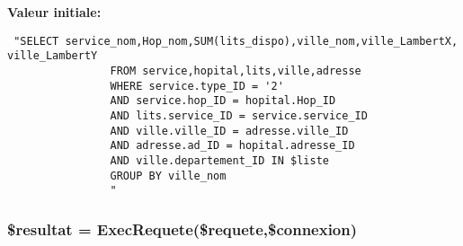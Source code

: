 {\bf Valeur initiale:}

\footnotesize\begin{verbatim} "SELECT service_nom,Hop_nom,SUM(lits_dispo),ville_nom,ville_LambertX, ville_LambertY
                FROM service,hopital,lits,ville,adresse
                WHERE service.type_ID = '2'
                AND service.hop_ID = hopital.Hop_ID
                AND lits.service_ID = service.service_ID
                AND ville.ville_ID = adresse.ville_ID
                AND adresse.ad_ID = hopital.adresse_ID
                AND ville.departement_ID IN $liste
                GROUP BY ville_nom
                "
\end{verbatim}\normalsize 
\hypertarget{teste__rea_8php_a3}{
\subsubsection[\$resultat]{\setlength{\rightskip}{0pt plus 5cm}\$resultat = Exec\-Requete(\$requete,\$connexion)}}
\label{teste__rea_8php_a3}


